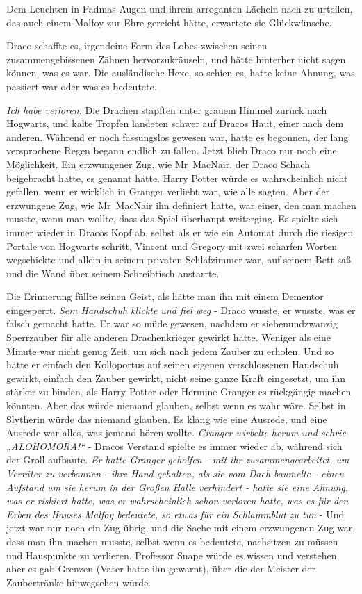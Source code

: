 {Dem Leuchten in Padmas Augen und ihrem arroganten Lächeln nach zu urteilen, das auch einem Malfoy zur Ehre gereicht hätte, erwartete sie Glückwünsche.

Draco schaffte es, irgendeine Form des Lobes zwischen seinen zusammengebissenen Zähnen hervorzukräuseln, und hätte hinterher nicht sagen können, was es war. Die ausländische Hexe, so schien es, hatte keine Ahnung, was passiert war oder was es bedeutete.

\emph{Ich habe verloren.} Die Drachen stapften unter grauem Himmel zurück nach Hogwarts, und kalte Tropfen landeten schwer auf Dracos Haut, einer nach dem anderen. Während er noch fassungslos gewesen war, hatte es begonnen, der lang versprochene Regen begann endlich zu fallen. Jetzt blieb Draco nur noch eine Möglichkeit. Ein erzwungener Zug, wie Mr~MacNair, der Draco Schach beigebracht hatte, es genannt hätte. Harry Potter würde es wahrscheinlich nicht gefallen, wenn er wirklich in Granger verliebt war, wie alle sagten. Aber der erzwungene Zug, wie Mr~MacNair ihn definiert hatte, war einer, den man machen musste, wenn man wollte, dass das Spiel überhaupt weiterging. Es spielte sich immer wieder in Dracos Kopf ab, selbst als er wie ein Automat durch die riesigen Portale von Hogwarts schritt, Vincent und Gregory mit zwei scharfen Worten wegschickte und allein in seinem privaten Schlafzimmer war, auf seinem Bett saß und die Wand über seinem Schreibtisch anstarrte.

Die Erinnerung füllte seinen Geist, als hätte man ihn mit einem Dementor eingesperrt. \emph{Sein Handschuh klickte und fiel weg} - Draco wusste, er wusste, was er falsch gemacht hatte. Er war so müde gewesen, nachdem er siebenundzwanzig Sperrzauber für alle anderen Drachenkrieger gewirkt hatte. Weniger als eine Minute war nicht genug Zeit, um sich nach jedem Zauber zu erholen. Und so hatte er einfach den Kolloportus auf seinen eigenen verschlossenen Handschuh gewirkt, einfach den Zauber gewirkt, nicht seine ganze Kraft eingesetzt, um ihn stärker zu binden, als Harry Potter oder Hermine Granger es rückgängig machen könnten. Aber das würde niemand glauben, selbst wenn es wahr wäre. Selbst in Slytherin würde das niemand glauben. Es klang wie eine Ausrede, und eine Ausrede war alles, was jemand hören wollte. \emph{Granger wirbelte herum und schrie „ALOHOMORA!“} - Dracos Verstand spielte es immer wieder ab, während sich der Groll aufbaute. \emph{Er hatte Granger geholfen - mit ihr zusammengearbeitet, um Verräter zu verbannen - ihre Hand gehalten, als sie vom Dach baumelte - einen Aufstand um sie herum in der Großen Halle verhindert - hatte sie eine Ahnung, was er riskiert hatte, was er wahrscheinlich schon verloren hatte, was es für den Erben des Hauses Malfoy bedeutete, so etwas} \emph{für ein Schlammblut zu tun} - Und jetzt war nur noch ein Zug übrig, und die Sache mit einem erzwungenen Zug war, dass man ihn machen musste, selbst wenn es bedeutete, nachsitzen zu müssen und Hauspunkte zu verlieren. Professor Snape würde es wissen und verstehen, aber es gab Grenzen (Vater hatte ihn gewarnt), über die der Meister der Zaubertränke hinwegsehen würde.

}
